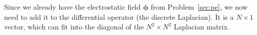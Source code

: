 \Answer{}
Since we already have the electrostatic field \(\bm{\phi}\) from Problem~\ref{sec:pe},
we now need to add it to the differential operator (the discrete Laplacian).
It is a \(N \times 1\) vector, which can fit into the diagonal of the
\(N^2 \times N^2\) Laplacian matrix.
